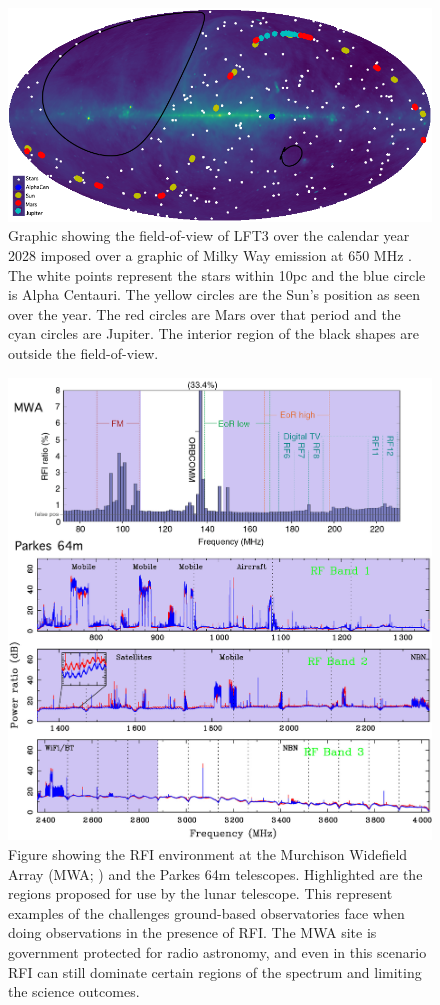 \begin{figure}
    \centering
    \includegraphics[width=0.95\linewidth]{figures/galaxy_plot.png}
    \caption{Graphic showing the field-of-view of LFT3 over the calendar year 2028 imposed over a graphic of Milky Way emission at 650 MHz \citep{2016ascl.soft03013P}.  The white points represent the stars within 10pc and the blue circle is Alpha Centauri. The yellow circles are the Sun's position as seen over the year. The red circles are Mars over that period and the cyan circles are Jupiter.  The interior region of the black shapes are outside the field-of-view.}
    \label{fig:fieldofview}
\end{figure}

\begin{figure}
    \centering
    \includegraphics[width=0.75\linewidth]{figures/RFI_Plot.png}
    \caption{Figure showing the RFI environment at the Murchison Widefield Array (MWA; \citealt{Offringa_RFI}) and the Parkes 64m \citep{Hobbs_2020} telescopes. Highlighted are the regions proposed for use by the lunar telescope. This represent examples of the challenges ground-based observatories face when doing observations in the presence of RFI. The MWA site is government protected for radio astronomy, and even in this scenario RFI can still dominate certain regions of the spectrum and limiting the science outcomes.}
    \label{fig:RFI}
\end{figure}

